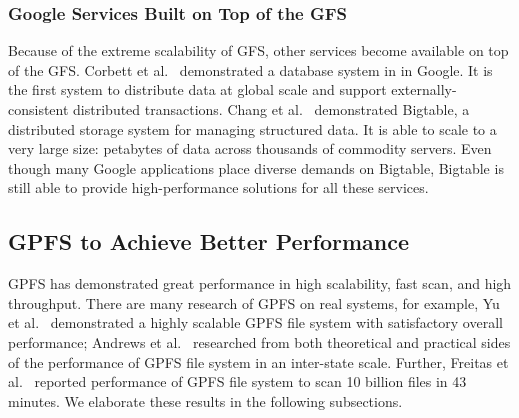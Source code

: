 \subsubsection{Google Services Built on Top of the GFS}
Because of the extreme scalability of GFS, other services become available
on top of the GFS.
%
Corbett et al.~\cite{Corbett2012a} demonstrated a database system in in Google.
%
It is the first system to distribute data at global scale and support 
externally-consistent distributed transactions. 
%
Chang et al.~\cite{Chang2006a} demonstrated Bigtable, 
a distributed storage system for managing structured data.
%
It is able to scale to a very large size: petabytes of data across thousands of commodity servers.
%
Even though many Google applications place diverse demands on Bigtable, 
Bigtable is still able to provide high-performance solutions for all these
services.



\subsection{GPFS to Achieve Better Performance}
GPFS has demonstrated great performance in high scalability, 
fast scan, and high throughput.
%
There are many research of GPFS on real systems, for example,
Yu et al.~\cite{Yu2006} demonstrated a highly scalable GPFS file system
with satisfactory overall performance;
%
Andrews et al.~\cite{Andrews2005} researched from both theoretical 
and practical sides of the performance of GPFS file system
in an inter-state scale.
%
Further, Freitas et al.~\cite{freitas2011gpfs} reported performance 
of GPFS file system to scan 10 billion files in 43 minutes. 
%
We elaborate these results in the following subsections.


